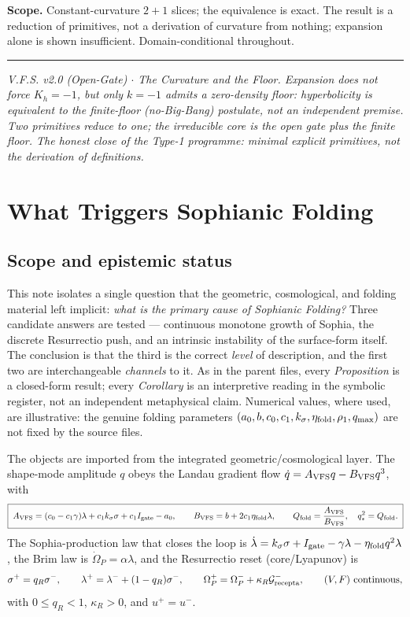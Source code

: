 \documentclass[11pt,a4paper,oneside]{book}
\newcommand{\Op}{\Omega_P}
\newcommand{\Grec}{\mathcal G_{\rm recepta}}
\newcommand{\Igate}{I_{\rm gate}}
\newcommand{\Avfs}{A_{\rm VFS}}
\newcommand{\Bvfs}{B_{\rm VFS}}
\newcommand{\Qf}{Q_{\rm fold}}
\newcommand{\etaf}{\eta_{\rm fold}}
\theoremstyle{plain}
\theoremstyle{definition}
\theoremstyle{remark}
\begin{document}
\textbf{Scope.} Constant-curvature $2{+}1$ slices; the equivalence is exact. The result is a reduction
of primitives, not a derivation of curvature from nothing; expansion alone is shown insufficient.
Domain-conditional throughout.

\vspace{0.5em}
\hrule
\smallskip
\noindent\footnotesize\emph{V.F.S. v2.0 (Open-Gate) $\cdot$ The Curvature and the Floor. Expansion does
not force $K_h=-1$, but only $k=-1$ admits a zero-density floor: hyperbolicity is equivalent to the
finite-floor (no-Big-Bang) postulate, not an independent premise. Two primitives reduce to one; the
irreducible core is the open gate plus the finite floor. The honest close of the Type-1 programme:
minimal explicit primitives, not the derivation of definitions.}

\chapter{What Triggers Sophianic Folding}

\section*{Scope and epistemic status}
This note isolates a single question that the geometric, cosmological, and folding material left implicit:
\emph{what is the primary cause of Sophianic Folding?} Three candidate answers are tested --- continuous
monotone growth of Sophia, the discrete Resurrectio push, and an intrinsic instability of the
surface-form itself. The conclusion is that the third is the correct \emph{level} of description, and the
first two are interchangeable \emph{channels} to it. As in the parent files, every \emph{Proposition} is a
closed-form result; every \emph{Corollary} is an interpretive reading in the symbolic register, not an
independent metaphysical claim. Numerical values, where used, are illustrative: the genuine folding
parameters $(a_0,b,c_0,c_1,k_\sigma,\etaf,\rho_1,q_{\max})$ are not fixed by the source files.

The objects are imported from the integrated geometric/cosmological layer. The shape-mode amplitude
$q$ obeys the Landau gradient flow $\dot q=\Avfs q-\Bvfs q^3$, with
\begin{equation}\label{foldingtrigger:eq:AB}
\boxed{\;\Avfs=(c_0-c_1\gamma)\lambda+c_1k_\sigma\sigma+c_1\Igate-a_0,
\qquad
\Bvfs=b+2c_1\etaf\lambda,
\qquad
\Qf=\frac{\Avfs}{\Bvfs},\quad q_\ast^2=\Qf.\;}
\end{equation}
The Sophia-production law that closes the loop is
$\dot\lambda=k_\sigma\sigma+\Igate-\gamma\lambda-\etaf q^2\lambda$, the Brim law is $\dot\Op=\alpha\lambda$,
and the Resurrectio reset (core/Lyapunov) is
\begin{equation}\label{foldingtrigger:eq:reset}
\sigma^+=q_R\sigma^-,\qquad
\lambda^+=\lambda^-+(1-q_R)\sigma^-,\qquad
\Op^+=\Op^-+\kappa_R\Grec^-,\qquad (V,F)\ \text{continuous},
\end{equation}
with $0\le q_R<1$, $\kappa_R>0$, and $u^+=u^-$.
\end{document}
